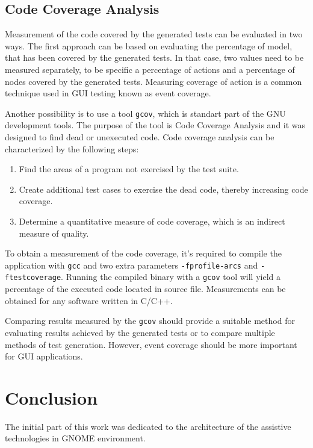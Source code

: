 \section{Code Coverage Analysis}
Measurement of the code covered by the generated tests can be evaluated in two ways. 
The first approach can be based on evaluating the percentage of model, that has been covered by the generated tests. In that case, two values need to be measured separately, to be specific a percentage of actions and a percentage of nodes covered by the generated tests.
Measuring coverage of action is a common technique used in GUI testing known as event coverage.\cite{NguyenBao2014Gait}

Another possibility is to use a tool \verb|gcov|, which is standart part of the GNU development tools. The purpose of the tool is Code Coverage Analysis and it was designed to find dead or unexecuted code. Code coverage analysis can be characterized by the following steps: 
\begin{enumerate}
  \item Find the areas of a program not exercised by the test suite.
  \item Create additional test cases to exercise the dead code, thereby increasing code coverage.
  \item Determine a quantitative measure of code coverage, which is an indirect measure of quality.
\end{enumerate}

To obtain a measurement of the code coverage, it's required to compile the application with \verb|gcc| and two extra parameters \verb|-fprofile-arcs| and \verb|-ftestcoverage|. Running the compiled binary with a \verb|gcov| tool will yield a percentage of the executed code located in source file. Measurements can be obtained for any software written in C/C++.\cite{gcov}

Comparing results measured by the \verb|gcov| should provide a suitable method for evaluating results achieved by the generated tests or to compare multiple methods of test generation. However, event coverage should be more important for GUI applications.


\chapter{Conclusion}
The initial part of this work was dedicated to the architecture of the assistive technologies in GNOME environment. 
